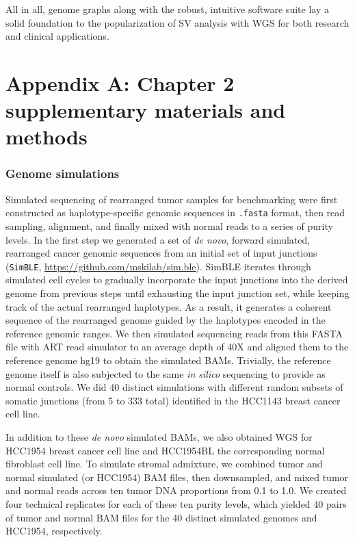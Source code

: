 \documentclass[phd,tocprelim]{cornell}
\newcommand{\ttt}[1]{\texttt{#1}}
\begin{document}
All in all, genome graphs along with the robust, intuitive software suite lay a solid foundation to the popularization of SV analysis with WGS for both research and clinical applications.

\appendix

\chapter*{Appendix A: Chapter 2 supplementary materials and methods} \label{app:a}
\subsection*{Genome simulations}
Simulated sequencing of rearranged tumor samples for benchmarking were first constructed as haplotype-specific genomic sequences in \ttt{.fasta} format, then read sampling, alignment, and finally mixed with normal reads to a series of purity levels. In the first step we generated a set of \textit{de novo}, forward simulated, rearranged cancer genomic sequences from an initial set of input junctions (\texttt{SimBLE}, \url{https://github.com/mskilab/sim.ble}). SimBLE iterates through simulated cell cycles to gradually incorporate the input junctions into the derived genome from previous steps until exhausting the input junction set, while keeping track of the actual rearranged haplotypes. As a result, it generates a coherent sequence of the rearranged genome guided by the haplotypes encoded in the reference genomic ranges. We then simulated sequencing reads from this FASTA file with ART read simulator \cite{Huang2012-zn} to an average depth of 40X and aligned them to the reference genome hg19 to obtain the simulated BAMs. Trivially, the reference genome itself is also subjected to the same \textit{in silico} sequencing to provide as normal controls. We did 40 distinct simulations with different random subsets of somatic junctions (from 5 to 333 total) identified in the HCC1143 breast cancer cell line. 

In addition to these \textit{de novo} simulated BAMs, we also obtained WGS for HCC1954 breast cancer cell line and HCC1954BL the corresponding normal fibroblast cell line.  To simulate stromal admixture, we combined tumor and normal simulated (or HCC1954) BAM files, then downsampled, and mixed tumor and normal reads across ten tumor DNA proportions from 0.1 to 1.0. We created four technical replicates for each of these ten purity levels, which yielded 40 pairs of tumor and normal BAM files for the 40 distinct simulated genomes and HCC1954, respectively.
\end{document}
